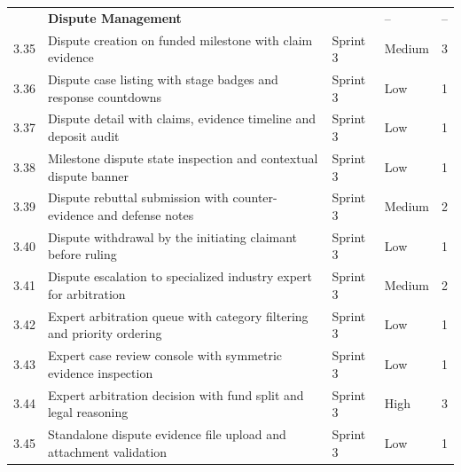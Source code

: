 \begin{longtable}{|
C{1.0cm}|
L{6.9cm}|
C{1.8cm}|
C{2.1cm}|
C{2.3cm}|}
 & \textbf{Dispute Management} &  & -- & -- \\
3.35 & Dispute creation on funded milestone with claim evidence & Sprint 3 & Medium & 3 \\
3.36 & Dispute case listing with stage badges and response countdowns & Sprint 3 & Low & 1 \\
3.37 & Dispute detail with claims, evidence timeline and deposit audit & Sprint 3 & Low & 1 \\
3.38 & Milestone dispute state inspection and contextual dispute banner & Sprint 3 & Low & 1 \\
3.39 & Dispute rebuttal submission with counter-evidence and defense notes & Sprint 3 & Medium & 2 \\
3.40 & Dispute withdrawal by the initiating claimant before ruling & Sprint 3 & Low & 1 \\
3.41 & Dispute escalation to specialized industry expert for arbitration & Sprint 3 & Medium & 2 \\
3.42 & Expert arbitration queue with category filtering and priority ordering & Sprint 3 & Low & 1 \\
3.43 & Expert case review console with symmetric evidence inspection & Sprint 3 & Low & 1 \\
3.44 & Expert arbitration decision with fund split and legal reasoning & Sprint 3 & High & 3 \\
3.45 & Standalone dispute evidence file upload and attachment validation & Sprint 3 & Low & 1 \\
\hline



\end{longtable}
